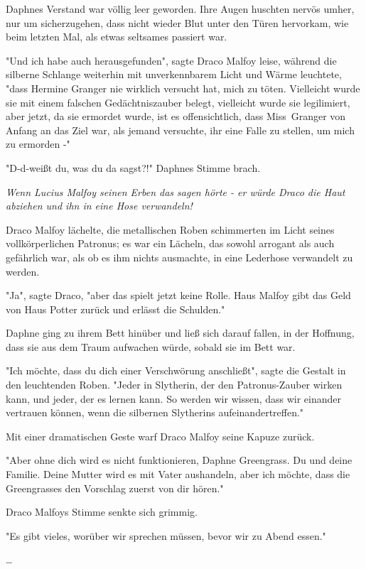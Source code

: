 {Daphnes Verstand war völlig leer geworden. Ihre Augen huschten nervös umher, nur um sicherzugehen, dass nicht wieder Blut unter den Türen hervorkam, wie beim letzten Mal, als etwas seltsames passiert war.

"Und ich habe auch herausgefunden", sagte Draco Malfoy leise, während die silberne Schlange weiterhin mit unverkennbarem Licht und Wärme leuchtete, "dass Hermine Granger nie wirklich versucht hat, mich zu töten. Vielleicht wurde sie mit einem falschen Gedächtniszauber belegt, vielleicht wurde sie legilimiert, aber jetzt, da sie ermordet wurde, ist es offensichtlich, dass Miss~Granger von Anfang an das Ziel war, als jemand versuchte, ihr eine Falle zu stellen, um mich zu ermorden -"

"D-d-weißt du, was du da sagst?!" Daphnes Stimme brach.

\emph{Wenn Lucius Malfoy seinen Erben das sagen hörte - er würde Draco die Haut abziehen und ihn in eine Hose verwandeln!}

Draco Malfoy lächelte, die metallischen Roben schimmerten im Licht seines vollkörperlichen Patronus; es war ein Lächeln, das sowohl arrogant als auch gefährlich war, als ob es ihm nichts ausmachte, in eine Lederhose verwandelt zu werden.

"Ja", sagte Draco, "aber das spielt jetzt keine Rolle. Haus Malfoy gibt das Geld von Haus Potter zurück und erlässt die Schulden."

Daphne ging zu ihrem Bett hinüber und ließ sich darauf fallen, in der Hoffnung, dass sie aus dem Traum aufwachen würde, sobald sie im Bett war.

"Ich möchte, dass du dich einer Verschwörung anschließt", sagte die Gestalt in den leuchtenden Roben. "Jeder in Slytherin, der den Patronus-Zauber wirken kann, und jeder, der es lernen kann. So werden wir wissen, dass wir einander vertrauen können, wenn die silbernen Slytherins aufeinandertreffen."

Mit einer dramatischen Geste warf Draco Malfoy seine Kapuze zurück.

"Aber ohne dich wird es nicht funktionieren, Daphne Greengrass. Du und deine Familie. Deine Mutter wird es mit Vater aushandeln, aber ich möchte, dass die Greengrasses den Vorschlag zuerst von dir hören."

Draco Malfoys Stimme senkte sich grimmig.

"Es gibt vieles, worüber wir sprechen müssen, bevor wir zu Abend essen."

…

}

